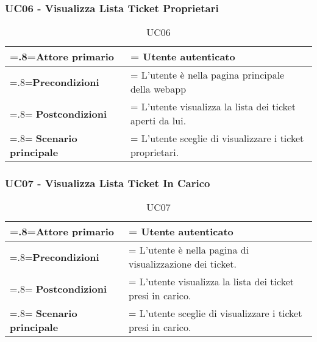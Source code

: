 \subsubsection{UC06 - Visualizza Lista Ticket Proprietari}  
 \begin{table}[H]
                \centering
                \renewcommand{\arraystretch}{1.8}
                \renewcommand\tabularxcolumn[1]{m{#1}}
                \begin{tabularx}{0.9\textwidth} {
                    >{\hsize=.8\hsize\linewidth=\hsize}X
                    >{\hsize=1.2\hsize\linewidth=\hsize}X}
                    \hline
                    \textbf{Attore primario} & Utente autenticato \\
                    \hline
                    \textbf{Precondizioni} & L'utente è nella pagina principale della webapp \\
                    \hline
                    \textbf{Postcondizioni} & L'utente visualizza la lista dei ticket aperti da lui. \\
                    \hline
                    \textbf{Scenario principale} & L'utente sceglie di visualizzare i ticket proprietari. \\
                    \hline
                \end{tabularx}
                \caption{UC06}
            \end{table}
     
     
\subsubsection{UC07 - Visualizza Lista Ticket In Carico}  
 \begin{table}[H]
                \centering
                \renewcommand{\arraystretch}{1.8}
                \renewcommand\tabularxcolumn[1]{m{#1}}
                \begin{tabularx}{0.9\textwidth} {
                    >{\hsize=.8\hsize\linewidth=\hsize}X
                    >{\hsize=1.2\hsize\linewidth=\hsize}X}
                    \hline
                    \textbf{Attore primario} & Utente autenticato \\
                    \hline
                    \textbf{Precondizioni} & L'utente è nella pagina di visualizzazione dei ticket. \\
                    \hline
                    \textbf{Postcondizioni} & L'utente visualizza la lista dei ticket presi in carico. \\
                    \hline
                    \textbf{Scenario principale} & L'utente sceglie di visualizzare i ticket presi in carico. \\
                    \hline
                \end{tabularx}
                \caption{UC07}
            \end{table}
            
